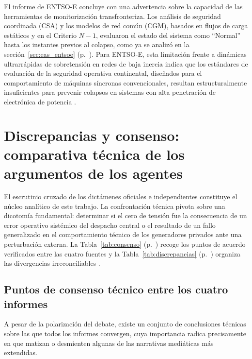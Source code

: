 El informe de ENTSO-E concluye con una advertencia sobre la capacidad
de las herramientas de monitorización transfronteriza. Los análisis de
seguridad coordinada (CSA) y los modelos de red común (CGM), basados
en flujos de carga estáticos y en el Criterio $N-1$, evaluaron el
estado del sistema como ``Normal'' hasta los instantes previos al
colapso, como ya se analizó en la sección~\ref{sec:eas_entsoe}
(p.~\pageref{sec:eas_entsoe}). Para ENTSO-E, esta limitación frente a
dinámicas ultrarrápidas de sobretensión en redes de baja inercia
indica que los estándares de evaluación de la seguridad operativa
continental, diseñados para el comportamiento de máquinas síncronas
convencionales, resultan estructuralmente insuficientes para prevenir
colapsos en sistemas con alta penetración de electrónica de potencia
\cite{entsoe2025,mitceepr2025,blackswan2025}.

\section{Discrepancias y consenso: comparativa técnica de los argumentos de los agentes}
\label{sec:discrepancias}

El escrutinio cruzado de los dictámenes oficiales e independientes
constituye el núcleo analítico de este trabajo. La confrontación
técnica pivota sobre una dicotomía fundamental: determinar si el cero
de tensión fue la consecuencia de un error operativo sistémico del
despacho central o el resultado de un fallo generalizado en el
comportamiento técnico de los generadores privados ante una
perturbación externa. La Tabla~\ref{tab:consenso}
(p.~\pageref{tab:consenso}) recoge los puntos de acuerdo verificados
entre las cuatro fuentes y la Tabla~\ref{tab:discrepancias}
(p.~\pageref{tab:discrepancias}) organiza las divergencias
irreconciliables \cite{gobierno2025,ree2025,icai2025,entsoe2025}.

\clearpage
\subsection*{Puntos de consenso técnico entre los cuatro informes}

A pesar de la polarización del debate, existe un conjunto de
conclusiones técnicas sobre las que todos los informes convergen, cuya
importancia radica precisamente en que matizan o desmienten algunas
de las narrativas mediáticas más extendidas.

